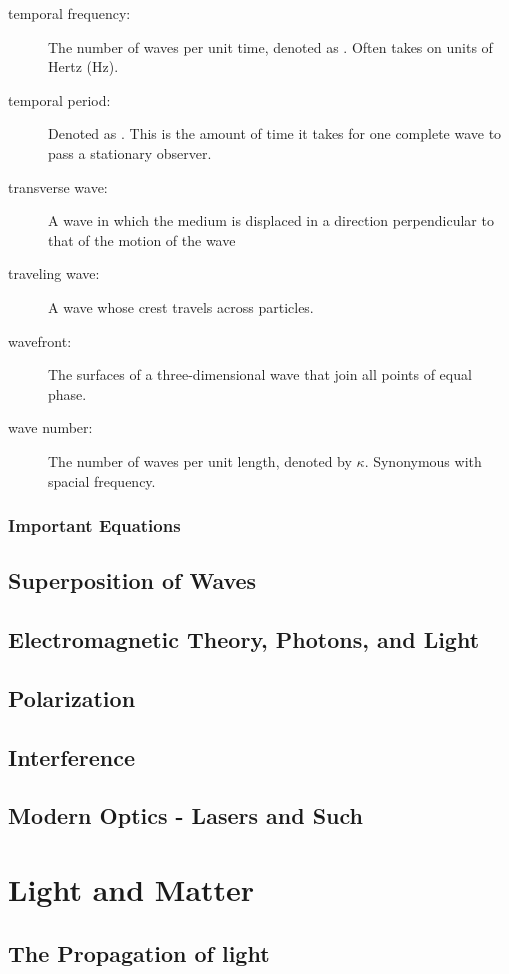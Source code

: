 \documentclass[12pt]{report}
\begin{document}
\begin{description}
\item[temporal frequency:] The number of waves per unit time, denoted as \textnu. Often takes on units of Hertz (Hz). 
\item[temporal period:] Denoted as \texttau. This is the amount of time it takes for one complete wave to pass a stationary observer.
\item[transverse wave:] A wave in which the medium is displaced in a direction perpendicular to that of the motion of the wave
\item[traveling wave:] A wave whose crest travels across particles.
\item[wavefront:] The surfaces of a three-dimensional wave that join all points of equal phase. 
\item[wave number:] The number of waves per unit length, denoted by $\kappa$. Synonymous with spacial frequency. 
\end{description}
\section{Important Equations}

\chapter{Superposition of Waves}
\chapter{Electromagnetic Theory, Photons, and Light}
\chapter{Polarization}
\chapter{Interference}
\chapter{Modern Optics - Lasers and Such}



\part{Light and Matter}
\chapter{The Propagation of light}
\end{document}
